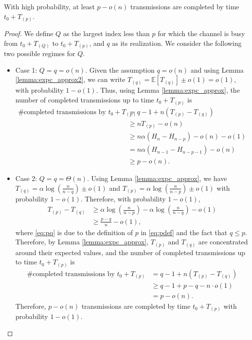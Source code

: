 \documentclass[onecolumn,journal,twoside]{IEEEtran}
\begin{document}
\begin{lemma}\label{lemma:main1}
With high probability, at least $p-o(n)$ transmissions are completed by time $t_0+T_{(p)}$.
\end{lemma}
\begin{proof}
We define $Q$ as the largest index less than $p$ for which the channel is busy from $t_0+T_{(Q)}$ to $t_0+T_{(p)}$, and $q$ as its realization. We consider the following two possible regimes for $Q$.
\begin{itemize}
\item Case 1: $Q = q=o(n)$.
Given the assumption $q=o(n)$ and using Lemma \ref{lemma:expc_approx2}, we can write $T_{(q)}=\mathbb{E}[T_{(q)}] \pm o(1)=o(1)$, with probability $1-o(1)$. Thus, using Lemma \ref{lemma:expc_approx}, the number of completed transmissions up to time $t_0+T_{(p)}$ is 
\begin{align}
\text{\# completed transmissions by } t_0+T_{(p)}&= q-1+n(T_{(p)}-T_{(q)})\nonumber\\
&\geq nT_{(p)} - o(n)\nonumber\\
&\geq n \alpha (H_n - H_{n-p}) - o(n)-o(1)\nonumber\\
& = n\alpha (H_{n-1} - H_{n-p-1}) - o(n)\nonumber\\
& \geq p-o(n).
\end{align}
\item Case 2: $Q = q=\Theta(n)$.
Using Lemma \ref{lemma:expc_approx}, we have $T_{(q)}=\alpha \log (\frac{n}{n-q}) \pm o(1)$ and $T_{(p)}=\alpha \log (\frac{n}{n-p}) \pm o(1)$ with probability $1-o(1)$. Therefore, with probability $1-o(1)$, 
\begin{align}\label{eq:pq}
T_{(p)}-T_{(q)} &\geq \alpha \log (\frac{n}{n-p}) - \alpha \log (\frac{n}{n-q}) - o(1) \nonumber\\ 
&\geq \frac{p-q}{n} -o(1),
\end{align}
where \eqref{eq:pq} is due to the definition of $p$ in \eqref{eq:pdef} and the fact that $q \leq p$.
Therefore, by Lemma \ref{lemma:expc_approx}, $T_{(p)}$ and $T_{(q)}$ are concentrated around their expected values, and the number of completed transmissions up to time $t_0+T_{(p)}$ is 
\begin{align}
\text{\# completed transmissions by } t_0+T_{(p)}&= q-1+n(T_{(p)}-T_{(q)})\nonumber\\
&\geq q-1 + p-q- n\cdot o(1)\nonumber\\
&=p-o(n).
\end{align}
 Therefore, $p-o(n)$ transmissions are completed by time $t_0+T_{(p)}$ with probability $1-o(1)$.
 \end{itemize}
\end{proof}
\end{document}
